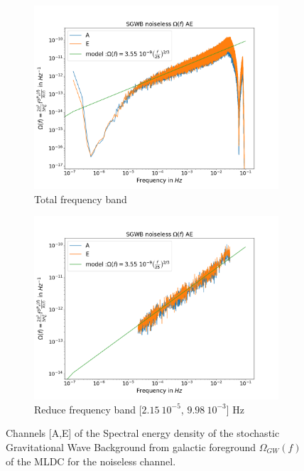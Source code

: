 \documentclass[a4paper,12pt]{article}
\begin{document}
\begin{figure}[H]
\begin{subfigure}{.5\textwidth}
  \centering
  \includegraphics[width=1.\linewidth]{noiseless/Omega_AE}
  \caption{Total frequency band }
\end{subfigure}%
\begin{subfigure}{.5\textwidth}
  \centering
  \includegraphics[width=1.\linewidth]{noiseless/Omega_AET}
  \caption{Reduce frequency band [$2.15 \ 10^{-5}$, $9.98 \ 10^{-3}$] $\text{Hz}$}
\end{subfigure}
\caption{Channels [A,E] of the Spectral energy density of the stochastic Gravitational Wave Background from galactic foreground $\Omega_{GW}(f)$ of the MLDC for the noiseless channel.}
\label{fig:Omeganoiseless}
\end{figure}
\end{document}

